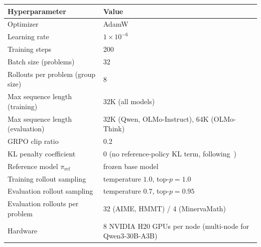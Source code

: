 \documentclass{llmxive}
\begin{document}
\begin{table}[!htbp]
  \centering
  \setlength{\tabcolsep}{4pt}
  \small
  \begin{tabular}{ll}
    \toprule
    \textbf{Hyperparameter}                              & \textbf{Value}                                            \\
    \midrule
    Optimizer                                            & AdamW                                                     \\
    Learning rate                                        & $1 \times 10^{-6}$                                        \\
    Training steps                                       & 200                                                       \\
    Batch size (problems)                                & 32                                                        \\
    Rollouts per problem (group size)                    & 8                                                         \\
    Max sequence length (training)                       & 32K (all models)                                          \\
    Max sequence length (evaluation)                     & 32K (Qwen, OLMo-Instruct), 64K (OLMo-Think)               \\
    GRPO clip ratio                                      & 0.2                                                       \\
    KL penalty coefficient                               & $0$ (no reference-policy KL term, following~\citep{dapo}) \\
    Reference model $\pi_{\text{ref}}$                   & frozen base model                                         \\
    Training rollout sampling                            & temperature $1.0$, top-$p\!=\!1.0$                        \\
    Evaluation rollout sampling                          & temperature $0.7$, top-$p\!=\!0.95$                       \\
    Evaluation rollouts per problem                      & 32 (AIME, HMMT) / 4 (MinervaMath)                         \\
    Hardware                                             & 8 NVIDIA H20 GPUs per node (multi-node for Qwen3-30B-A3B) \\

\end{tabular}
\end{table}
\end{document}
